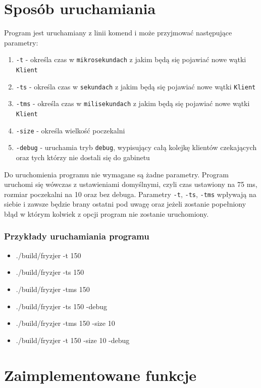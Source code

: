 \documentclass[12pt,a4paper]{article}
\begin{document}
	\section{Sposób uruchamiania}
	Program jest uruchamiany z linii komend i może przyjmować następujące parametry:
	\begin{enumerate}[label=\alph*)]
		\item \texttt{-t}  - określa czas w \texttt{mikrosekundach} z jakim będą 
				się pojawiać nowe wątki \texttt{Klient}
		\item \texttt{-ts} - określa czas w \texttt{sekundach} z jakim będą 
				się pojawiać nowe wątki \texttt{Klient}
		\item \texttt{-tms} - określa czas w \texttt{milisekundach} z jakim będą 
				się pojawiać nowe wątki \texttt{Klient}
		\item \texttt{-size} - określa wielkość poczekalni
		\item \texttt{-debug} - uruchamia tryb \texttt{debug}, wypisujący całą 
				kolejkę klientów czekających oraz tych którzy nie dostali się do 
				gabinetu 
	\end{enumerate}
	Do uruchomienia programu nie wymagane są żadne parametry. Program uruchomi 
	się wówczas z ustawieniami domyślnymi, czyli czas ustawiony na 75 ms, rozmiar 
	poczekalni na 10 oraz bez debuga. Parametry \texttt{-t}, \texttt{-ts}, \texttt{-tms} 
	wpływają na siebie i zawsze będzie brany ostatni pod uwagę oraz jeżeli zostanie 
	popełniony błąd w którym kolwiek z opcji program nie zostanie uruchomiony.
	\subsubsection*{Przykłady uruchamiania programu}
	\begin{itemize}
		\item ./build/fryzjer -t   150
		\item ./build/fryzjer -ts  150
		\item ./build/fryzjer -tms 150
		\item ./build/fryzjer -ts  150 -debug
		\item ./build/fryzjer -tms 150 -size 10
		\item ./build/fryzjer -t   150 -size 10 -debug
	\end{itemize}
 	 	
 	\section{Zaimplementowane funkcje}
\end{document}
